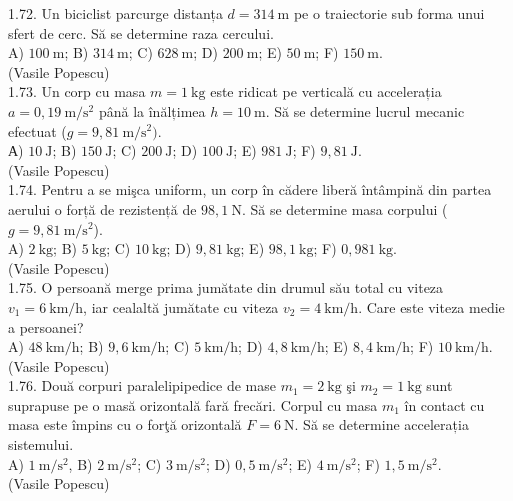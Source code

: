 \documentclass[10pt]{article}
\begin{document}
1.72. Un biciclist parcurge distanța $d=314 \mathrm{~m}$ pe o traiectorie sub forma unui sfert de cerc. Să se determine raza cercului.\\ A) $100 \mathrm{~m}$; B) $314 \mathrm{~m}$; C) $628 \mathrm{~m}$; D) $200 \mathrm{~m}$; E) $50 \mathrm{~m}$; F) $150 \mathrm{~m}$.\\ (Vasile Popescu)\\

1.73. Un corp cu masa $m=1 \mathrm{~kg}$ este ridicat pe verticală cu accelerația $a=0,19 \mathrm{~m} / \mathrm{s}^{2}$ până la înălțimea $h=10 \mathrm{~m}$. Să se determine lucrul mecanic efectuat ($g=9,81 \mathrm{~m} / \mathrm{s}^{2})$.\\ А) $10 \mathrm{~J}$; B) $150 \mathrm{~J}$; C) $200 \mathrm{~J}$; D) $100 \mathrm{~J}$; E) $981 \mathrm{~J}$; F) $9,81 \mathrm{~J}$.\\ (Vasile Popescu)\\

1.74. Pentru a se mişca uniform, un corp în cădere liberă întâmpină din partea aerului o forță de rezistență de $98,1 \mathrm{~N}$. Să se determine masa corpului ($g=9,81 \mathrm{~m} / \mathrm{s}^{2}$).\\ A) $2 \mathrm{~kg}$; B) $5 \mathrm{~kg}$; C) $10 \mathrm{~kg}$; D) $9,81 \mathrm{~kg}$; E) $98,1 \mathrm{~kg}$; F) $0,981 \mathrm{~kg}$.\\ (Vasile Popescu)\\

1.75. O persoană merge prima jumătate din drumul său total cu viteza $v_{1}=6 \mathrm{~km} / \mathrm{h}$, iar cealaltă jumătate cu viteza $v_{2}=4 \mathrm{~km} / \mathrm{h}$. Care este viteza medie a persoanei?\\ A) $48 \mathrm{~km} / \mathrm{h}$; B) $9,6 \mathrm{~km} / \mathrm{h}$; C) $5 \mathrm{~km} / \mathrm{h}$; D) $4,8 \mathrm{~km} / \mathrm{h}$; E) $8,4 \mathrm{~km} / \mathrm{h}$; F) $10 \mathrm{~km} / \mathrm{h}$.\\ (Vasile Popescu)\\

1.76. Două corpuri paralelipipedice de mase $m_{1}=2 \mathrm{~kg}$ şi $m_{2}=1 \mathrm{~kg}$ sunt suprapuse pe o masă orizontală fară frecări. Corpul cu masa $m_{1}$ în contact cu masa este împins cu o forţă orizontală $F=6 \mathrm{~N}$. Să se determine accelerația sistemului.\\ A) $1 \mathrm{~m} / \mathrm{s}^{2}$, B) $2 \mathrm{~m} / \mathrm{s}^{2}$; C) $3 \mathrm{~m} / \mathrm{s}^{2}$; D) $0,5 \mathrm{~m} / \mathrm{s}^{2}$; E) $4 \mathrm{~m} / \mathrm{s}^{2}$; F) $1,5 \mathrm{~m} / \mathrm{s}^{2}$.\\ (Vasile Popescu)\\
\end{document}
